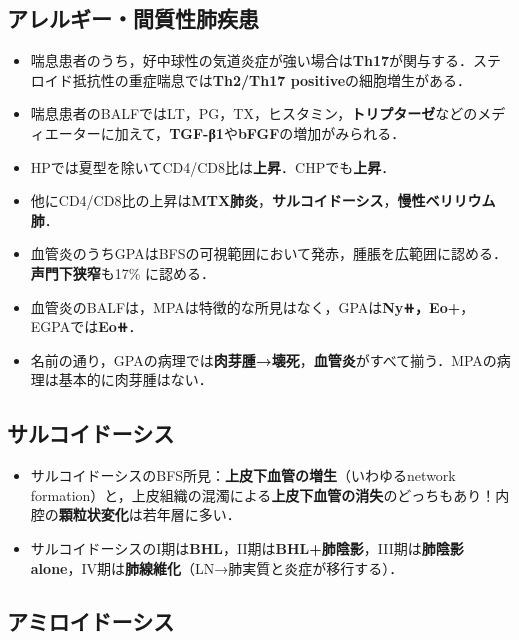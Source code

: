 \subsection{アレルギー・間質性肺疾患}
\begin{itemize}

\item 喘息患者のうち，好中球性の気道炎症が強い場合は\textbf{Th17}が関与する．ステロイド抵抗性の重症喘息では\textbf{Th2/Th17 positive}の細胞増生がある．
\item 喘息患者のBALFではLT，PG，TX，ヒスタミン，\textbf{トリプターゼ}などのメディエーターに加えて，\textbf{TGF-β1}や\textbf{bFGF}の増加がみられる．
\item HPでは夏型を除いてCD4/CD8比は\textbf{上昇}．CHPでも\textbf{上昇}．
\item 他にCD4/CD8比の上昇は\textbf{MTX肺炎}，\textbf{サルコイドーシス}，\textbf{慢性ベリリウム肺}．

\item 血管炎のうちGPAはBFSの可視範囲において発赤，腫脹を広範囲に認める．\textbf{声門下狭窄}も17\% に認める．
\item 血管炎のBALFは，MPAは特徴的な所見はなく，GPAは\textbf{Ny⧺，Eo+}，EGPAでは\textbf{Eo⧺}．
\item 名前の通り，GPAの病理では\textbf{肉芽腫→壊死}，\textbf{血管炎}がすべて揃う．MPAの病理は基本的に肉芽腫はない．

\end{itemize}

\subsection{サルコイドーシス}

\begin{itemize}

\item サルコイドーシスのBFS所見：\textbf{上皮下血管の増生}（いわゆるnetwork formation）と，上皮組織の混濁による\textbf{上皮下血管の消失}のどっちもあり！内腔の\textbf{顆粒状変化}は若年層に多い．
\item サルコイドーシスのI期は\textbf{BHL}，II期は\textbf{BHL+肺陰影}，III期は\textbf{肺陰影 alone}，IV期は\textbf{肺線維化}（LN→肺実質と炎症が移行する）．\end{itemize}

\subsection{アミロイドーシス}

